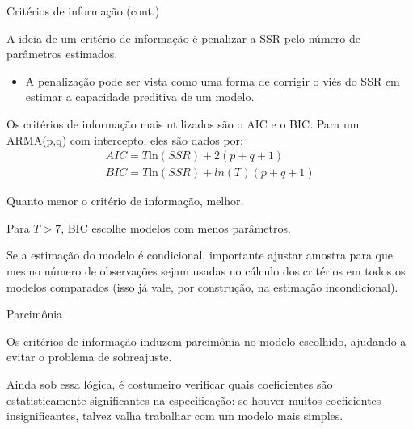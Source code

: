 \documentclass[11pt]{beamer}
\newenvironment{halfwideitemize}{\itemize\addtolength{\itemsep}{0.5em}}{\enditemize}
\begin{document}
\begin{frame}{Critérios de informação (cont.)}
	\begin{halfwideitemize}
		\item A ideia de {\color{blue}um critério de informação} é {\color{blue}penalizar} a SSR pelo número de parâmetros estimados. 
		\begin{itemize}
			\item A penalização pode ser vista como uma forma de corrigir o viés do SSR em estimar a capacidade preditiva de um modelo.
		\end{itemize}
		\item Os critérios de informação mais utilizados são o AIC e o BIC. Para um ARMA(p,q) com intercepto, eles são dados por:
		\begin{equation*}
			\begin{aligned}
				AIC = T\text{ln}(SSR) + 2 (p+q+1) \\
				BIC = T \text{ln}(SSR) + ln(T) (p+q+1)
			\end{aligned}
		\end{equation*}
		\item Quanto menor o critério de informação, melhor.
		\item Para $T > 7$, BIC escolhe modelos com menos parâmetros.
		\item Se a estimação do modelo é condicional, importante ajustar amostra para que mesmo número de observações sejam usadas no cálculo dos critérios em todos os modelos comparados (isso já vale, por construção, na estimação incondicional).
	\end{halfwideitemize}
\end{frame}

\begin{frame}{Parcimônia}
	\begin{halfwideitemize}
		\item Os critérios de informação induzem {\color{blue}parcimônia} no modelo escolhido, ajudando a evitar o problema de sobreajuste.
		\item Ainda sob essa lógica, é costumeiro verificar quais coeficientes são estatisticamente significantes na especificação: se houver muitos coeficientes insignificantes, talvez valha trabalhar com um modelo mais simples. 
	\end{halfwideitemize}
\end{frame}
\end{document}
